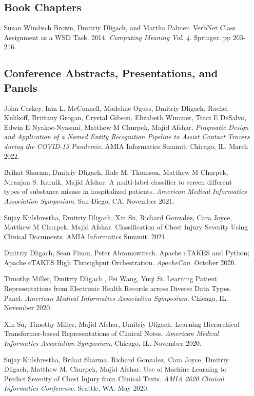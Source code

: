 \documentclass[letterpaper]{article}
\renewenvironment{itemize}{
  \begin{list}{}{
    \setlength{\leftmargin}{1.5em}
  }
}{
  \end{list}
}
\begin{document}
\subsection*{Book Chapters}
\begin{itemize}
\item Susan Windisch Brown, Dmitriy Dligach, and Martha Palmer. VerbNet Class Assignment as a WSD Task. 2014. \emph{Computing Meaning Vol. 4}. Springer. pp 203-216.
\end{itemize}

\subsection*{Conference Abstracts, Presentations, and Panels}
\begin{itemize}
\item John Caskey, Iain L. McConnell, Madeline Oguss, Dmitriy Dligach, Rachel Kulikoff,  Brittany Grogan, Crystal Gibson, Elizabeth Wimmer, Traci E DeSalvo, Edwin E Nyakoe-Nyasani, Matthew M Churpek, Majid Afshar. \emph{Pragmatic Design and Application of a Named Entity Recognition Pipeline to Assist Contact Tracers during the COVID-19 Pandemic}. AMIA Informatics Summit. Chicago, IL. March 2022.
\item Brihat Sharma, Dmitriy Dligach, Hale M. Thomson, Matthew M Churpek, Niranjan S. Karnik, Majid Afshar. A multi-label classifier to screen different types of substance misuse in hospitalized patients. \emph{American Medical Informatics Association Symposium}. San-Diego, CA. November 2021.
\item Sujay Kulshrestha, Dmitriy Dligach, Xin Su, Richard Gonzalez, Cara Joyce, Matthew M Churpek, Majid Afshar. Classification of Chest Injury Severity Using Clinical Documents. AMIA Informatics Summit. 2021.
\item Dmitriy Dligach, Sean Finan, Peter Abramowitsch. Apache cTAKES and Python; Apache cTAKES High Throughput Orchestration. \emph{ApacheCon}. October 2020.
\item Timothy Miller, Dmitriy Dligach , Fei Wang, Yuqi Si. Learning Patient Representations from Electronic Health Records across Diverse Data Types. Panel. \emph{American Medical Informatics Association Symposium}. Chicago, IL. November 2020.
\item Xin Su, Timothy Miller, Majid Afshar, Dmitriy Dligach. Learning Hierarchical Transformer-based Representations of Clinical Notes. \emph{American Medical Informatics Association Symposium}. Chicago, IL. November 2020.
\item Sujay Kulshrestha, Brihat Sharma, Richard Gonzalez, Cara Joyce, Dmitriy Dligach, Matthew M. Churpek, Majid Afshar. Use of Machine Learning to Predict Severity of Chest Injury from Clinical Texts. \emph{AMIA 2020 Clinical Informatics Conference}. Seattle, WA. May 2020.

\end{itemize}
\end{document}
